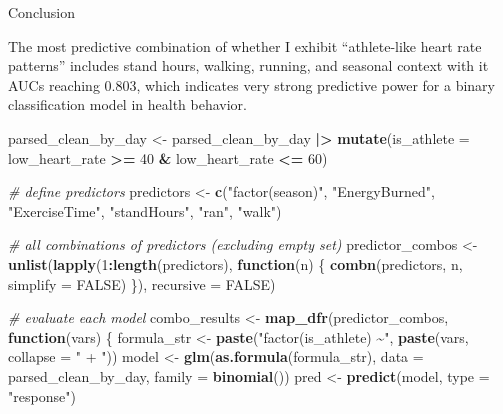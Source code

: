 \documentclass[
  11pt,
]{article}
\newenvironment{Shaded}{\begin{snugshade}}{\end{snugshade}}
\newcommand{\AttributeTok}[1]{\textcolor[rgb]{0.13,0.29,0.53}{#1}}
\newcommand{\CommentTok}[1]{\textcolor[rgb]{0.56,0.35,0.01}{\textit{#1}}}
\newcommand{\ConstantTok}[1]{\textcolor[rgb]{0.56,0.35,0.01}{#1}}
\newcommand{\ControlFlowTok}[1]{\textcolor[rgb]{0.13,0.29,0.53}{\textbf{#1}}}
\newcommand{\DecValTok}[1]{\textcolor[rgb]{0.00,0.00,0.81}{#1}}
\newcommand{\FunctionTok}[1]{\textcolor[rgb]{0.13,0.29,0.53}{\textbf{#1}}}
\newcommand{\NormalTok}[1]{#1}
\newcommand{\OtherTok}[1]{\textcolor[rgb]{0.56,0.35,0.01}{#1}}
\newcommand{\SpecialCharTok}[1]{\textcolor[rgb]{0.81,0.36,0.00}{\textbf{#1}}}
\newcommand{\StringTok}[1]{\textcolor[rgb]{0.31,0.60,0.02}{#1}}
\begin{document}
Conclusion

The most predictive combination of whether I exhibit ``athlete-like
heart rate patterns'' includes stand hours, walking, running, and
seasonal context with it AUCs reaching 0.803, which indicates very
strong predictive power for a binary classification model in health
behavior.

\begin{Shaded}
\begin{Highlighting}[]
\NormalTok{parsed\_clean\_by\_day }\OtherTok{\textless{}{-}}\NormalTok{ parsed\_clean\_by\_day }\SpecialCharTok{|\textgreater{}}
  \FunctionTok{mutate}\NormalTok{(}\AttributeTok{is\_athlete =}\NormalTok{ low\_heart\_rate }\SpecialCharTok{\textgreater{}=} \DecValTok{40} \SpecialCharTok{\&}\NormalTok{ low\_heart\_rate }\SpecialCharTok{\textless{}=} \DecValTok{60}\NormalTok{)}

\CommentTok{\# define predictors}
\NormalTok{predictors }\OtherTok{\textless{}{-}} \FunctionTok{c}\NormalTok{(}\StringTok{"factor(season)"}\NormalTok{, }\StringTok{"EnergyBurned"}\NormalTok{, }\StringTok{"ExerciseTime"}\NormalTok{, }\StringTok{"standHours"}\NormalTok{, }\StringTok{"ran"}\NormalTok{, }\StringTok{"walk"}\NormalTok{)}

\CommentTok{\# all combinations of predictors (excluding empty set)}
\NormalTok{predictor\_combos }\OtherTok{\textless{}{-}} \FunctionTok{unlist}\NormalTok{(}\FunctionTok{lapply}\NormalTok{(}\DecValTok{1}\SpecialCharTok{:}\FunctionTok{length}\NormalTok{(predictors), }\ControlFlowTok{function}\NormalTok{(n) \{}
  \FunctionTok{combn}\NormalTok{(predictors, n, }\AttributeTok{simplify =} \ConstantTok{FALSE}\NormalTok{)}
\NormalTok{\}), }\AttributeTok{recursive =} \ConstantTok{FALSE}\NormalTok{)}

\CommentTok{\# evaluate each model}
\NormalTok{combo\_results }\OtherTok{\textless{}{-}} \FunctionTok{map\_dfr}\NormalTok{(predictor\_combos, }\ControlFlowTok{function}\NormalTok{(vars) \{}
\NormalTok{  formula\_str }\OtherTok{\textless{}{-}} \FunctionTok{paste}\NormalTok{(}\StringTok{"factor(is\_athlete) \textasciitilde{}"}\NormalTok{, }\FunctionTok{paste}\NormalTok{(vars, }\AttributeTok{collapse =} \StringTok{" + "}\NormalTok{))}
\NormalTok{  model }\OtherTok{\textless{}{-}} \FunctionTok{glm}\NormalTok{(}\FunctionTok{as.formula}\NormalTok{(formula\_str), }\AttributeTok{data =}\NormalTok{ parsed\_clean\_by\_day, }\AttributeTok{family =} \FunctionTok{binomial}\NormalTok{())}
\NormalTok{  pred }\OtherTok{\textless{}{-}} \FunctionTok{predict}\NormalTok{(model, }\AttributeTok{type =} \StringTok{"response"}\NormalTok{)}
  

\end{Highlighting}
\end{Shaded}
\end{document}
